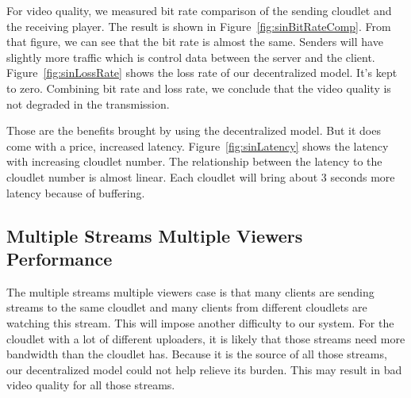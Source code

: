 \documentclass[letterpaper,twocolumn,10pt]{article}
\begin{document}
For video quality, we measured bit rate comparison of the sending cloudlet and the receiving player. The result is shown in Figure~\ref{fig:sinBitRateComp}. From that figure, we can see that the bit rate is almost the same. Senders will have slightly more traffic which is control data between the server and the client. Figure~\ref{fig:sinLossRate} shows the loss rate of our decentralized model. It's kept to zero. Combining bit rate and loss rate, we conclude that the video quality is not degraded in the transmission.

Those are the benefits brought by using the decentralized model. But it does come with a price, increased latency. Figure~\ref{fig:sinLatency} shows the latency with increasing cloudlet number. The relationship between the latency to the cloudlet number is almost linear. Each cloudlet will bring about 3 seconds more latency because of buffering.


\subsection{Multiple Streams Multiple Viewers Performance}

The multiple streams multiple viewers case is that many clients are sending streams to the same cloudlet and many clients from different cloudlets are watching this stream. This will impose another difficulty to our system. For the cloudlet with a lot of different uploaders, it is likely that those streams need more bandwidth than the cloudlet has. Because it is the source of all those streams, our decentralized model could not help relieve its burden. This may result in bad video quality for all those streams.
\end{document}
